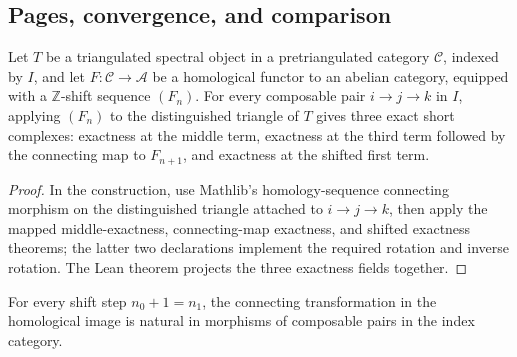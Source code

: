 \subsection{Pages, convergence, and comparison}

\begin{theorem}
  \label{thm:homological-spectral-object-exactness}
  \leanok
  Let $T$ be a triangulated spectral object in a pretriangulated category
  $\mathcal C$, indexed by $I$, and let $F:\mathcal C\to\mathcal A$ be a
  homological functor to an abelian category, equipped with a $\mathbb Z$-shift
  sequence $(F_n)$.  For every composable pair $i\to j\to k$ in $I$, applying
  $(F_n)$ to the distinguished triangle of $T$ gives three exact short
  complexes: exactness at the middle term, exactness at the third term followed
  by the connecting map to $F_{n+1}$, and exactness at the shifted first term.
\end{theorem}

\begin{proof}
  \leanok
  In the construction, use Mathlib's homology-sequence connecting morphism on
  the distinguished triangle attached to $i\to j\to k$, then apply the mapped
  middle-exactness, connecting-map exactness, and shifted exactness theorems;
  the latter two declarations implement the required rotation and inverse
  rotation.  The Lean theorem projects the three exactness fields together.
\end{proof}

\begin{theorem}
  \label{thm:homological-image-delta-naturality}
  \leanok
  For every shift step $n_0+1=n_1$, the connecting transformation in the
  homological image is natural in morphisms of composable pairs in the index
  category.
\end{theorem}

